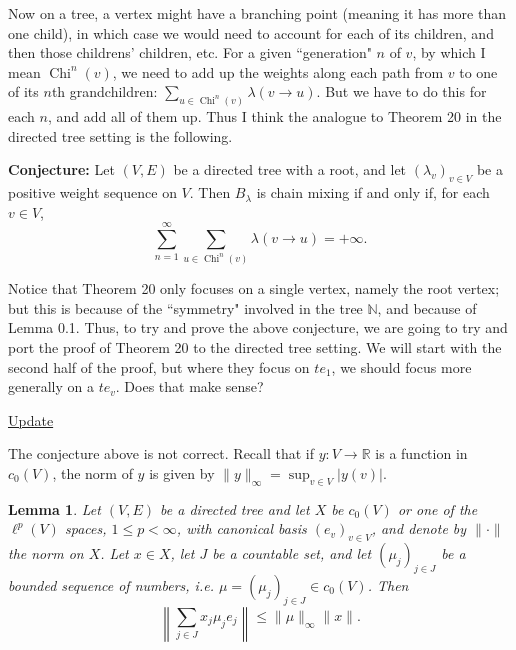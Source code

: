 \documentclass{article}
\newcommand{\ds}{\displaystyle}
\newtheorem{lemma}[theorem]{Lemma}
\theoremstyle{definition}\newtheorem{remark}[theorem]{Remark}
\theoremstyle{definition}\newtheorem{example}[theorem]{Example}
\theoremstyle{definition}\newtheorem{fact}[theorem]{Fact}
\theoremstyle{definition}\newtheorem{diagram}[theorem]{Diagram}
\theoremstyle{definition}\newtheorem{definition}[theorem]{Definition}
\theoremstyle{definition}\newtheorem{question}[theorem]{Question}
\newcommand{\R}{\mathbb{R}}
\newcommand{\N}{\mathbb{N}}
\DeclareMathOperator{\Child}{Chi}
\begin{document}
Now on a tree, a vertex might have a branching point (meaning it has more than one child), in which case we would need to account for each of its children, and then those childrens' children, etc. For a given ``generation" $n$ of $v$, by which I mean $\Child^n(v)$, we need to add up the weights along each path from $v$ to one of its $n$th grandchildren: $\ds\sum_{u\in \Child^n(v)} \lambda (v\to u)$. But we have to do this for each $n$, and add all of them up. Thus I think the analogue to Theorem 20 in the directed tree setting is the following.

{\bf Conjecture:} Let $(V,E)$ be a directed tree with a root, and let $(\lambda_v)_{v\in V}$ be a positive weight sequence on $V$. Then $B_\lambda$ is chain mixing if and only if, for each $v\in V$, 
\[\sum_{n=1}^\infty \sum_{u\in\Child^n(v)} \lambda(v\to u)=+\infty.\]

Notice that Theorem 20 only focuses on a single vertex, namely the root vertex; but this is because of the ``symmetry" involved in the tree $\N$, and because of Lemma 0.1.  Thus, to try and prove the above conjecture, we are going to try and port the proof of Theorem 20 to the directed tree setting. We will start with the second half of the proof, but where they focus on $te_1$, we should focus more generally on a $te_v$. Does that make sense?

\underline{{\Large Update}}

The conjecture above is not correct. Recall that if $y:V\to \R$ is a function in $c_0(V)$, the norm of $y$ is given by $\|y\|_\infty = \sup_{v\in V} |y(v)|$.

\begin{lemma}
    Let $(V,E)$ be a directed tree and let $X$ be $c_0(V)$ or one of the $\ell^p(V)$ spaces, $1\leq p<\infty$, with canonical basis $(e_v)_{v\in V}$, and denote by $\|\cdot \|$ the norm on $X$. Let $x\in X$, let $J$ be a countable set, and let $(\mu_j)_{j\in J}$ be a bounded sequence of numbers, i.e. $\mu=(\mu_j)_{j\in J}\in c_0(V)$. Then 
    \[\left \|\sum_{j\in J} x_j \mu_j e_j \right\| \leq \|\mu\|_\infty \|x\|.\]
\end{lemma}
\end{document}
